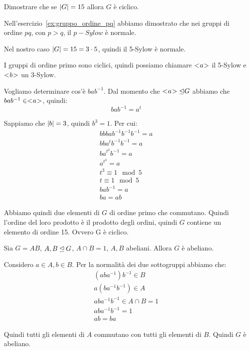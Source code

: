 \begin{esercizio}
    Dimostrare che se $\lvert G \rvert = 15$ allora $G$ è ciclico.
\end{esercizio}
\begin{soluzione}
    Nell'esercizio~\ref{ex:gruppo_ordine_pq} abbiamo dimostrato che nei gruppi di ordine $pq$, con $p > q$,
    il $p-Sylow$ è normale.

    Nel nostro caso $\lvert G \rvert = 15 = 3 \cdot 5$, quindi il 5-Sylow è normale.

    I gruppi di ordine primo sono ciclici, quindi possiamo chiamare $< \negmedspace a \negmedspace >$ il 5-Sylow e $< \negmedspace b \negmedspace >$ un 3-Sylow.

    Vogliamo determinare cos'è $bab^{-1}$.
    Dal momento che $< \negmedspace a \negmedspace > \unlhd G$ abbiamo che $bab^{-1} \in < \negmedspace a \negmedspace >$, quindi:
    \begin{equation*}
        bab^{-1} = a^t
    \end{equation*}

    Sappiamo che $\lvert b \rvert = 3$, quindi $b^3 = 1$.
    Per cui:
    \begin{gather*}
        bbb a b^{-1}b^{-1}b^{-1} = a \\
        bb a^t b^{-1}b^{-1} = a \\
        b a^{t^2} b^{-1} = a \\
        a^{t^3} = a \\
        t^3 \equiv 1 \mod 5 \\
        t \equiv 1 \mod 5 \\
        bab^{-1} = a \\
        ba = ab
    \end{gather*}

    Abbiamo quindi due elementi di $G$ di ordine primo che commutano.
    Quindi l'ordine del loro prodotto è il prodotto degli ordini, quindi $G$ contiene un elemento di ordine 15.
    Ovvero G è ciclico.
\end{soluzione}

\begin{esercizio}
    Sia $G = AB$, $A, B \unlhd G$, $A \cap B = 1$, $A, B$ abeliani.
    Allora $G$ è abeliano.
\end{esercizio}
\begin{soluzione}
    Considero $a \in A, b \in B$.
    Per la normalità dei due sottogruppi abbiamo che:
    \begin{gather*}
        (aba^{-1})b^{-1} \in B \\
        a(ba^{-1}b^{-1}) \in A \\
        aba^{-1}b^{-1} \in A \cap B = 1 \\
        aba^{-1}b^{-1} = 1 \\
        ab = ba
    \end{gather*}

    Quindi tutti gli elementi di $A$ commutano con tutti gli elementi di $B$.
    Quindi $G$ è abeliano.
\end{soluzione}

